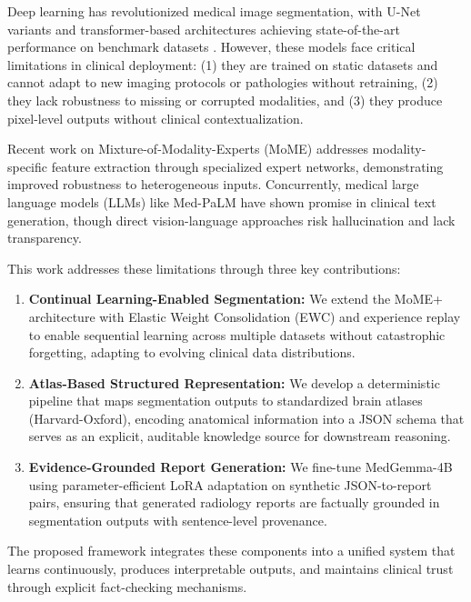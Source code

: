 \documentclass[conference]{IEEEtran}
\begin{document}
Deep learning has revolutionized medical image segmentation, with U-Net variants and transformer-based architectures achieving state-of-the-art performance on benchmark datasets \cite{isensee2021nnu, hatamizadeh2022swin}. However, these models face critical limitations in clinical deployment: (1) they are trained on static datasets and cannot adapt to new imaging protocols or pathologies without retraining, (2) they lack robustness to missing or corrupted modalities, and (3) they produce pixel-level outputs without clinical contextualization.

Recent work on Mixture-of-Modality-Experts (MoME) \cite{zhang2024mome} addresses modality-specific feature extraction through specialized expert networks, demonstrating improved robustness to heterogeneous inputs. Concurrently, medical large language models (LLMs) like Med-PaLM \cite{singhal2023medpalm} have shown promise in clinical text generation, though direct vision-language approaches risk hallucination and lack transparency.

This work addresses these limitations through three key contributions:

\begin{enumerate}
\item \textbf{Continual Learning-Enabled Segmentation:} We extend the MoME+ architecture with Elastic Weight Consolidation (EWC) and experience replay to enable sequential learning across multiple datasets without catastrophic forgetting, adapting to evolving clinical data distributions.

\item \textbf{Atlas-Based Structured Representation:} We develop a deterministic pipeline that maps segmentation outputs to standardized brain atlases (Harvard-Oxford), encoding anatomical information into a JSON schema that serves as an explicit, auditable knowledge source for downstream reasoning.

\item \textbf{Evidence-Grounded Report Generation:} We fine-tune MedGemma-4B using parameter-efficient LoRA adaptation on synthetic JSON-to-report pairs, ensuring that generated radiology reports are factually grounded in segmentation outputs with sentence-level provenance.
\end{enumerate}

The proposed framework integrates these components into a unified system that learns continuously, produces interpretable outputs, and maintains clinical trust through explicit fact-checking mechanisms.
\end{document}
